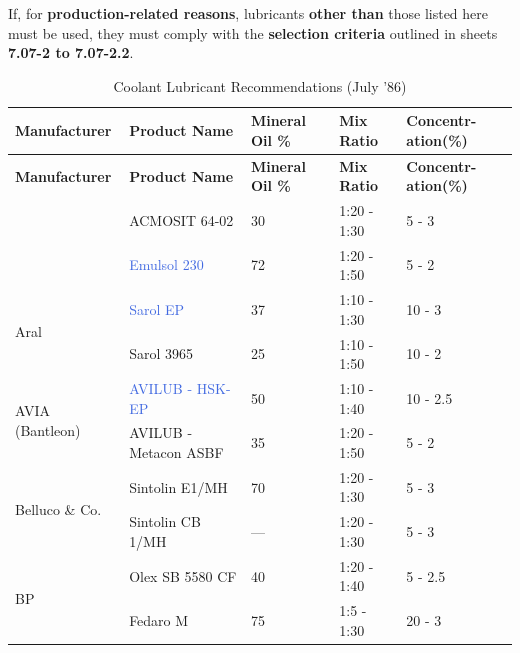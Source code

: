 
If, for \textbf{production-related reasons}, lubricants \textbf{other than} those listed here must be used, they must comply with the \textbf{selection criteria} outlined in sheets \textbf{7.07-2 to 7.07-2.2}.

\renewcommand{\arraystretch}{1.3}
\begin{longtable}{|p{3.5cm}|p{4.5cm}|p{1.5cm}|p{2.7cm}|p{2cm}|}
    \caption{Coolant Lubricant Recommendations (July '86)}
    \label{tab:coolant_lubricants} \\
    \hline
    \textbf{Manufacturer} & \textbf{Product Name} & \textbf{Mineral Oil \%} & \textbf{Mix Ratio} & \textbf{Concentr-} \newline \textbf{ation(\%)} \\
    \hline
    \endfirsthead

    \hline
    \textbf{Manufacturer} & \textbf{Product Name} & \textbf{Mineral Oil \%} & \textbf{Mix Ratio} & \textbf{Concentr-} \newline \textbf{ation(\%)} \\
    \hline
    \endhead

    \hline
    \endfoot

    \hline
    \endlastfoot

    \multirow{2}{*}{ACMOS} & ACMOSIT 64-02 & 30 & 1:20 - 1:30 & 5 - 3 \\
    \cline{2-5}
    & \textcolor{RoyalBlue}{Emulsol 230} & 72 & 1:20 - 1:50 & 5 - 2 \\
    \hline

    \multirow{2}{*}{Aral} & \textcolor{RoyalBlue}{Sarol EP} & 37 & 1:10 - 1:30 & 10 - 3 \\
    \cline{2-5}
    & Sarol 3965 & 25 & 1:10 - 1:50 & 10 - 2 \\
    \hline

    \multirow{2}{*}{AVIA (Bantleon)} & \textcolor{RoyalBlue}{AVILUB - HSK-EP} & 50 & 1:10 - 1:40 & 10 - 2.5 \\
    \cline{2-5}
    & AVILUB - Metacon ASBF & 35 & 1:20 - 1:50 & 5 - 2 \\
    \hline

    \multirow{2}{*}{Belluco \& Co.} & Sintolin E1/MH & 70 & 1:20 - 1:30 & 5 - 3 \\
    \cline{2-5}
    & Sintolin CB 1/MH & --- & 1:20 - 1:30 & 5 - 3 \\
    \hline

    \multirow{2}{*}{BP} & Olex SB 5580 CF & 40 & 1:20 - 1:40 & 5 - 2.5 \\
    \cline{2-5}
    & Fedaro M & 75 & 1:5 - 1:30 & 20 - 3 \\
    \hline


\end{longtable}
